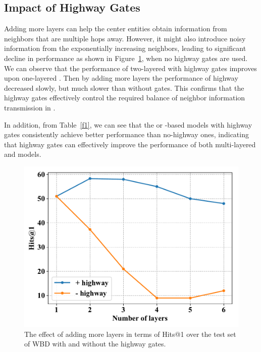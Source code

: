 \subsection{Impact of Highway Gates} Adding more \HRGCN layers can help the center entities obtain information from neighbors that are multiple hops
away. However, it might also introduce noisy information from the exponentially increasing neighbors, leading to significant decline in
performance as shown in Figure~\ref{highway}, when no highway gates are used. We can observe that the performance of two-layered \RGCNs
with highway gates improves upon one-layered \RGCN. Then by adding more layers the performance of highway \RGCNs decreased slowly, but much
slower than \RGCNs without gates. This confirms that the highway gates effectively control the required balance of neighbor information
transmission in \RGCNs.

In addition, from Table~\ref{f1}, we can see that the \GCN or \RGCN-based models with highway gates consistently achieve better performance than no-highway ones, indicating that highway gates can effectively improve the performance of both multi-layered \GCN and \RGCN models.
\begin{figure}
	\centering
	\includegraphics[width=0.9\linewidth]{figures/graph3.pdf}
	\caption{The effect of adding more \RGCN layers in terms of Hits@1 over the test set of WBD with and without the highway gates.}
	\label{highway}
\end{figure}
